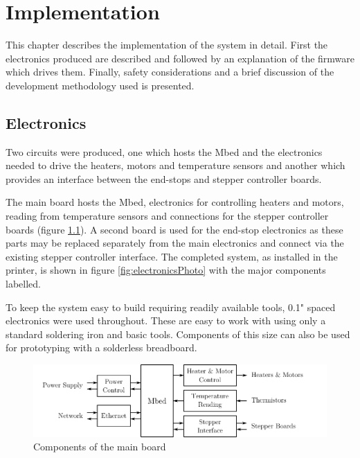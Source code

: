 \chapter{Implementation}
	
	\label{sec:implementation}
	
	This chapter describes the implementation of the system in detail. First the
	electronics produced are described and followed by an explanation of the
	firmware which drives them. Finally, safety considerations and a brief
	discussion of the development methodology used is presented.
	
	\section{Electronics}
		
		Two circuits were produced, one which hosts the Mbed and the electronics
		needed to drive the heaters, motors and temperature sensors and another
		which provides an interface between the end-stops and stepper controller
		boards.
		
		The main board hosts the Mbed, electronics for controlling heaters and
		motors, reading from temperature sensors and connections for the stepper
		controller boards (figure \ref{fig:electronicsDiagram}). A second board is
		used for the end-stop electronics as these parts may be replaced separately
		from the main electronics and connect via the existing stepper controller
		interface. The completed system, as installed in the printer, is shown in
		figure \ref{fig:electronicsPhoto} with the major components labelled.
		
		To keep the system easy to build requiring readily available tools, 0.1"
		spaced electronics were used throughout. These are easy to work with using
		only a standard soldering iron and basic tools. Components of this size can
		also be used for prototyping with a solderless breadboard.
		
		\begin{figure}
			\includegraphics[width=1\textwidth]{diagrams/electronicsDiagram.pdf}
			\caption{Components of the main board}
			\label{fig:electronicsDiagram}
		\end{figure}
		
